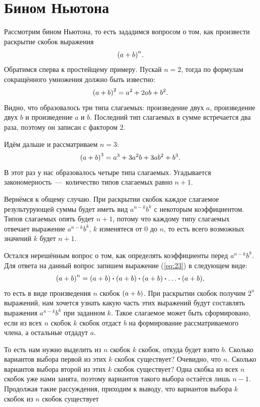\documentclass[12pt]{article}
\begin{document}
\section{Бином Ньютона}
Рассмотрим бином Ньютона, то есть зададимся вопросом о том, как произвести раскрытие скобок выражения
\begin{equation}\label{eq:23}
    \qty(a+b)^n.
\end{equation}
Обратимся сперва к простейщему примеру. Пускай $n=2$, тогда по формулам сокращённого умножения должно быть известно:
\begin{equation}
    \qty(a+b)^2 = a^2 + 2ab + b^2.
\end{equation}
Видно, что образовалось три типа слагаемых: произведение двух $a$, произведение двух $b$ и произведение $a$ и $b$. Последний тип слагаемых в сумме встречается два раза, поэтому он записан с фактором $2$.
\par
Идём дальше и рассматриваем $n=3$:
\begin{equation}
    \qty(a+b)^3 = a^3 + 3a^2b+3ab^2+b^3.
\end{equation}
В этот раз у нас образовалось четыре типа слагаемых. Угадывается закономерность~\----~количество типов слагаемых равно $n+1$.
\par
Вернёмся к общему случаю. При раскрытии скобок каждое слагаемое результурующей суммы будет иметь вид $a^{n-k}b^k$ с некоторым коэффициентом. Типов слагаемых опять будет $n+1$, потому что каждому типу слагаемых отвечает выражение $a^{n-k}b^k$, $k$ изменятеся от $0$ до $n$, то есть всего возможных значений $k$ будет $n+1$.
\par
Остался нерешённым вопрос о том, как определять коэффициенты перед $a^{n-k}b^k$. Для ответа на данный вопрос запишем выражение (\ref{eq:23}) в следующем виде:
\begin{equation}
    \qty(a+b)^n = \qty(a+b) \vdot  \qty(a+b) \vdot  \qty(a+b) \vdot \ldots \vdot  \qty(a+b),
\end{equation}
то есть в виде произведения $n$ скобок $\qty(a+b)$. При раскрытии скобок получим $2^n$ выражений, нам хочется узнать какую часть этих выражений будут составлять выражения $a^{n-k}b^k$ при заданном $k$. Такое слагаемое может быть сформировано, если из  всех $n$ скобок $k$ скобок отдаст $b$ на формирование рассматриваемого члена, а остальные отдадут $a$. \par
То есть нам нужно выделить из $n$ скобок $k$ скобок, откуда будет взято $b$. Сколько вариантов выбора первой из этих $k$ скобок существует? Очевидно, что $n$. Сколько вариантов выбора второй из этих $k$ скобок существует? Одна скобка из всех $n$ скобок уже нами занята, поэтому вариантов такого выбора остаётся лишь $n-1$. Продолжая такие рассуждения, приходим к выводу, что вариантов выбора $k$ скобок из $n$ скобок существует
\end{document}

